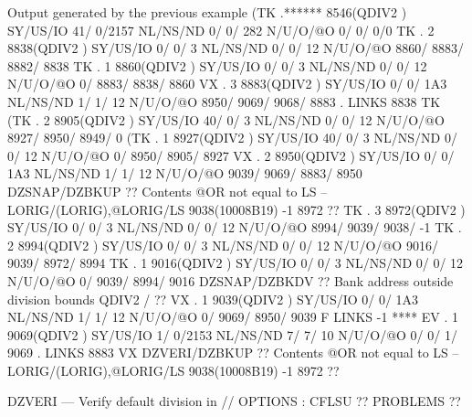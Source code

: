 \begin{Listing}{Output generated by the previous example}
(TK  .******     8546(QDIV2   ) SY/US/IO   41/    0/2157 NL/NS/ND    0/    0/     282 N/U/O/@O       0/       0/       0/0       
 TK  .     2     8838(QDIV2   ) SY/US/IO    0/    0/   3 NL/NS/ND    0/    0/      12 N/U/O/@O    8860/    8883/    8882/    8838
 TK  .     1     8860(QDIV2   ) SY/US/IO    0/    0/   3 NL/NS/ND    0/    0/      12 N/U/O/@O       0/    8883/    8838/    8860
 VX  .     3     8883(QDIV2   ) SY/US/IO    0/    0/ 1A3 NL/NS/ND    1/    1/      12 N/U/O/@O    8950/    9069/    9068/    8883
     . LINKS      8838 TK                                                                                                        
(TK  .     2     8905(QDIV2   ) SY/US/IO   40/    0/   3 NL/NS/ND    0/    0/      12 N/U/O/@O    8927/    8950/    8949/       0
(TK  .     1     8927(QDIV2   ) SY/US/IO   40/    0/   3 NL/NS/ND    0/    0/      12 N/U/O/@O       0/    8950/    8905/    8927
 VX  .     2     8950(QDIV2   ) SY/US/IO    0/    0/ 1A3 NL/NS/ND    1/    1/      12 N/U/O/@O    9039/    9069/    8883/    8950
 DZSNAP/DZBKUP ?? Contents @OR not equal to LS -- LORIG/(LORIG),@LORIG/LS                 9038(10008B19)      -1    8972       ?? 
 TK  .     3     8972(QDIV2   ) SY/US/IO    0/    0/   3 NL/NS/ND    0/    0/      12 N/U/O/@O    8994/    9039/    9038/      -1
 TK  .     2     8994(QDIV2   ) SY/US/IO    0/    0/   3 NL/NS/ND    0/    0/      12 N/U/O/@O    9016/    9039/    8972/    8994
 TK  .     1     9016(QDIV2   ) SY/US/IO    0/    0/   3 NL/NS/ND    0/    0/      12 N/U/O/@O       0/    9039/    8994/    9016
 DZSNAP/DZBKDV ?? Bank address outside division bounds                                QDIV2   /                                ?? 
 VX  .     1     9039(QDIV2   ) SY/US/IO    0/    0/ 1A3 NL/NS/ND    1/    1/      12 N/U/O/@O       0/    9069/    8950/    9039
     F LINKS        -1 ****                                                                                                      
 EV  .     1     9069(QDIV2   ) SY/US/IO    1/    0/2153 NL/NS/ND    7/    7/      10 N/U/O/@O       0/       0/       1/    9069
     . LINKS      8883 VX                                                                                                        
 DZVERI/DZBKUP ?? Contents @OR not equal to LS -- LORIG/(LORIG),@LORIG/LS                 9038(10008B19)      -1    8972       ?? 
                                                                                                                                 
DZVERI --- Verify default division in //                                                           OPTIONS : CFLSU ?? PROBLEMS ??


\end{Listing}
